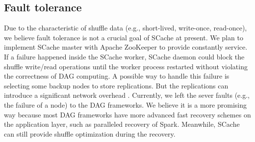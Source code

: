 \subsection{Fault tolerance}\label{fault}
Due to the characteristic of shuffle data (e.g., short-lived, write-once, read-once), we believe fault tolerance is not a crucial goal of SCache at present. 
We plan to implement SCache master with Apache ZooKeeper \cite{zookeeper} to provide constantly service. 
If a failure happened inside the SCache worker, SCache daemon could block the shuffle write/read operations until the worker process restarted without violating the correctness of DAG computing.
A possible way to handle this failure is selecting some backup nodes to store replications. 
But the replications can introduce a significant network overhead \cite{availability}.  
Currently, we left the sever faults (e.g., the failure of a node) to the DAG frameworks. 
We believe it is a more promising way because most DAG frameworks have more advanced fast recovery schemes on the application layer, such as paralleled recovery of Spark. 
Meanwhile, SCache can still provide shuffle optimization during the recovery.





